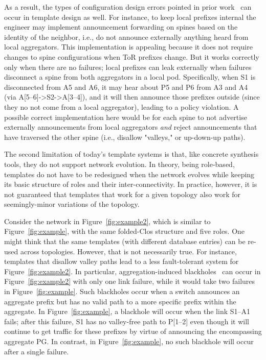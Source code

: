 \documentclass{sig-alternate-10pt}
\begin{document}
As a result, the types of configuration design errors pointed in prior work~\cite{propane} can occur in template design as well. For instance, to keep local prefixes internal the engineer may implement announcement forwarding on spines based on the identity of the neighbor, i.e., do not announce externally anything heard from local aggregators. This implementation is appealing because it does not require changes to spine configurations when ToR prefixes change. But it works correctly only when there are no failures; local prefixes can leak externally when failures disconnect a spine from both aggregators in a local pod. Specifically, when S1 is disconnected from A5 and A6, it may hear about P5 and P6 from A3 and A4 (via A[5--6]->S2->A[3--4]), and it will then announce those prefixes outside (since they no not come from a local aggregator), leading to a policy violation. A possible correct implementation here would be for each spine to not advertise externally announcements from local aggregators {\em and} reject announcements that have traversed the other spine (i.e., disallow "valleys," or up-down-up paths).


The second limitation of today's template systems is that, like concrete synthesis tools, they do not support network evolution. In theory, being role-based, templates do not have to be redesigned when the network evolves while keeping its basic structure of roles and their inter-connectivity. In practice, however, it is not guaranteed that templates that work for a given topology also work for seemingly-minor variations of the topology. 

Consider the network in Figure~\ref{fig:example2}, which is similar to Figure~\ref{fig:example}, with the same folded-Clos structure and five roles. One might think that the same templates (with different database entries) can be re-used across topologies. However, that is not necessarily true. For instance, templates that disallow valley paths lead to a less fault-tolerant system for Figure~\ref{fig:example2}. In particular, aggregation-induced blackholes~\cite{x} can occur in Figure~\ref{fig:example2} with only one link failure, while it would take two failures in Figure~\ref{fig:example}. Such blackholes occur when a switch announces an aggregate prefix but has no valid path to a more specific prefix within the aggregate. In Figure~\ref{fig:example}, a blackhole will occur when the link S1--A1 fails; after this failure, S1 has no valley-free path to P[1--2] even though it will continue to get traffic for these prefixes by virtue of announcing the encompassing aggregate PG. In contrast, in Figure~\ref{fig:example}, no such blackhole will occur after a single failure.
\end{document}
